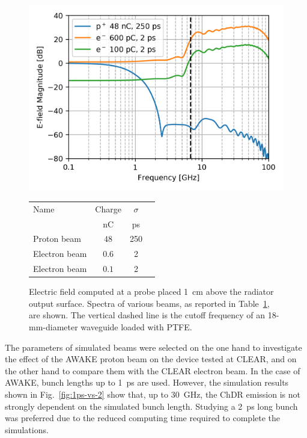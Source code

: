 \begin{figure}[!b]
\centering
\includegraphics[scale=1, keepaspectratio]{pictures/protons_clear}
\caption{Electric field computed at a probe placed 1~cm above the radiator output surface. Spectra of various beams, as reported in Table~\ref{tab:sim_param_comparison}, are shown. The vertical dashed line is the cutoff frequency of an 18-mm-diameter waveguide loaded with PTFE.}
\label{fig:protons_in_clear}

\vspace{4mm}

\begin{tabular}{l c c c}
\toprule
Name  & Charge & $\sigma$ \\
& nC & ps \\
\midrule
Proton beam			& $48$	  & 250	\\
Electron beam		& $0.6$	  & 2		\\
Electron beam		& $0.1$	  & 2		\\
\bottomrule
\end{tabular}
 \label{tab:sim_param_comparison}
\end{figure}

The parameters of simulated beams were selected on the one hand to investigate the effect of the AWAKE proton beam on the device tested at CLEAR, and on the other hand to compare them with the CLEAR electron beam. In the case of AWAKE, bunch lengths up to 1~ps are used. However, the simulation results shown in Fig.~\ref{fig:1ps-vs-2} show that, up to 30~GHz, the ChDR emission is not strongly dependent on the simulated bunch length. Studying a 2~ps long bunch was preferred due to the reduced computing time required to complete the simulations.




